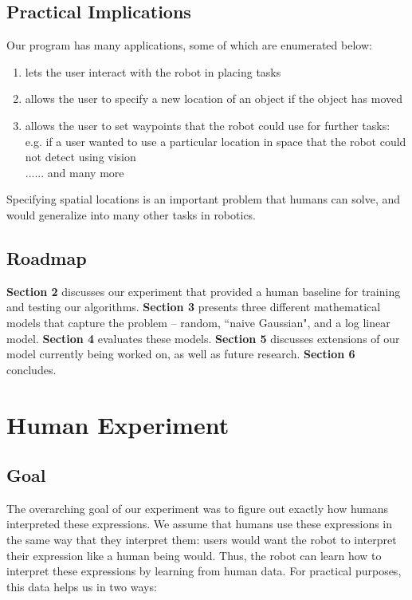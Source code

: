 \documentclass[12pt,letterpaper]{article}
\begin{document}
\subsection{Practical Implications}

Our program has many applications, some of which are enumerated below:

\begin{enumerate}[(1)]
\item lets the user interact with the robot in placing tasks
\item allows the user to specify a new location of an object if the object has moved
\item allows the user to set waypoints that the robot could use for further tasks: e.g. if a user wanted to use a particular location in space that the robot could not detect using vision \\
...... and many more
\end{enumerate}

Specifying spatial locations is an important problem that humans can solve, and would generalize into many other tasks in robotics. 

\subsection{Roadmap}

\textbf{Section 2} discusses our experiment that provided a human baseline for training and testing our algorithms. \textbf{Section 3} presents three different mathematical models that capture the problem \--- random, ``naive Gaussian", and a log linear model.  \textbf{Section 4} evaluates these models. \textbf{Section 5} discusses extensions of our model currently being worked on, as well as future research. \textbf{Section 6} concludes.

\section{Human Experiment}

\subsection{Goal}

The overarching goal of our experiment was to figure out exactly how humans interpreted these expressions. We assume that humans use these expressions in the same way that they interpret them: users would want the robot to interpret their expression like a human being would. Thus, the robot can learn how to interpret these expressions by learning from human data. For practical purposes, this data helps us in two ways:
\end{document}
